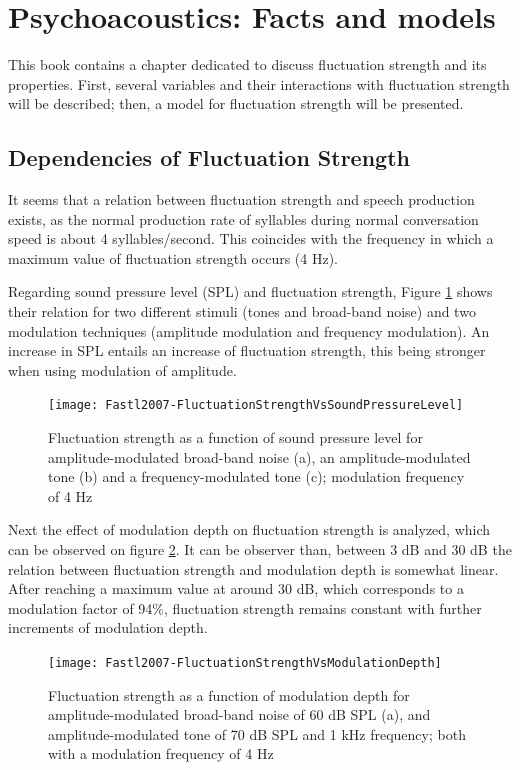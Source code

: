 \section{Psychoacoustics: Facts and models}

This book contains a chapter dedicated to discuss fluctuation strength and its
properties. First, several variables and their interactions with fluctuation
strength will be described; then, a model for fluctuation strength will be
presented.

\subsection{Dependencies of Fluctuation Strength}

It seems that a relation between fluctuation strength and speech production
exists, as the normal production rate of syllables during normal conversation
speed is about 4 syllables/second. This coincides with the frequency in which a
maximum value of fluctuation strength occurs (4 Hz).

Regarding sound pressure level (SPL) and fluctuation strength, Figure
\ref{fig:flucstrenvsndpreslvl} shows their relation for two different stimuli
(tones and broad-band noise) and two modulation techniques (amplitude modulation
and frequency modulation). An increase in SPL entails an increase of fluctuation
strength, this being stronger when using modulation of amplitude.

\begin{figure}
    \centering
    \texttt{[image: Fastl2007-FluctuationStrengthVsSoundPressureLevel]}
    \caption{Fluctuation strength as a function of sound pressure level for
        amplitude-modulated broad-band noise (a), an amplitude-modulated tone
        (b) and a frequency-modulated tone (c); modulation frequency of 4 Hz
        \cite[pp. 249]{Fastl2007Psychoacoustics}}
    \label{fig:flucstrenvsndpreslvl}
\end{figure}

Next the effect of modulation depth on fluctuation strength is analyzed, which
can be observed on figure \ref{fig:flucstrenvsmoddep}. It can be observer than,
between 3 dB and 30 dB the relation between fluctuation strength and modulation
depth is somewhat linear. After reaching a maximum value at around 30 dB, which
corresponds to a modulation factor of 94\%, fluctuation strength remains
constant with further increments of modulation depth.

\begin{figure}
    \centering
    \texttt{[image: Fastl2007-FluctuationStrengthVsModulationDepth]}
    \caption{Fluctuation strength as a function of modulation depth for
        amplitude-modulated broad-band noise of 60 dB SPL (a), and
        amplitude-modulated tone of 70 dB SPL and 1 kHz frequency; both with a
        modulation frequency of 4 Hz \cite[pp. 249]{Fastl2007Psychoacoustics}}
    \label{fig:flucstrenvsmoddep}
\end{figure}

